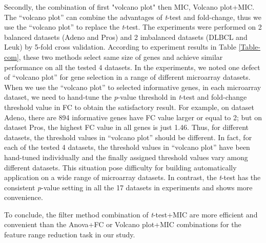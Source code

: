 \documentclass[10pt,journal,compsoc]{IEEEtran}
\begin{document}
	Secondly, the combination of first "volcano plot" then MIC, Volcano plot+MIC. The “volcano plot” can combine the advantages of \emph{t}-test and fold-change, thus we use the “volcano plot” to replace the \emph{t}-test. The experiments were performed on 2 balanced datasets (Adeno and Pros) and 2 imbalanced datasets (DLBCL and Leuk) by 5-fold cross validation. According to experiment results in Table \ref{Table-com}, these two methods select same size of genes and achieve similar performance on all the tested 4 datasets.
	In the experiments, we noted one defect of “volcano plot” for gene selection in a range of different microarray datasets. When we use the “volcano plot” to selected informative genes, in each microarray dataset, we need to hand-tune the \emph{p}-value threshold in \emph{t}-test and fold-change threshold value in FC to obtain the satisfactory result. For example, on dataset Adeno, there are 894 informative genes have FC value larger or equal to 2; but on dataset Pros, the highest FC value in all genes is just 1.46. Thus, for different datasets, the threshold values in “volcano plot” should be different. In fact, for each of the tested 4 datasets, the threshold values in “volcano plot” have been hand-tuned individually and the finally assigned threshold values vary among different datasets. This situation pose difficulty for building automatically application on a wide range of microarray datasets. In contrast, the \emph{t}-test has the consistent \emph{p}-value setting in all the 17 datasets in experiments and shows more convenience.

	To conclude, the filter method combination of \emph{t}-test+MIC are more efficient and convenient than the Anova+FC or Volcano plot+MIC combinations for the feature range reduction task in our study.



	
	
\end{document}
